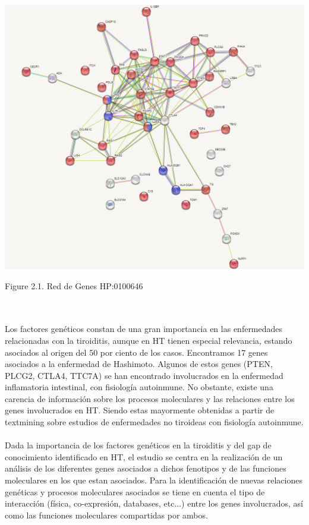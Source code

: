 \vspace{5mm}
\begin{center}
 
    \includegraphics[scale=0.4]{figures/red de genes.png}
    
    Figure 2.1. Red de Genes HP:0100646
\end{center}
\\ \\ 
\vspace{5mm}
Los factores genéticos constan de una gran importancia en las enfermedades relacionadas con la tiroiditis, aunque en HT tienen especial relevancia, estando asociados al origen del 50 por ciento de los casos.\cite{Zheng2020} Encontramos 17 genes asociados a la enfermedad de Hashimoto. Algunos de estos genes (PTEN, PLCG2, CTLA4, TTC7A) se han encontrado involucrados en la enfermedad inflamatoria intestinal, con fisiología autoinmune. No obstante, existe una carencia de información sobre los procesos moleculares y las relaciones entre los genes involucrados en HT. Siendo estas mayormente obtenidas a partir de textmining sobre estudios de enfermedades no tiroideas con fisiología autoinmune. \cite{StringHP:0000872}
\\ \\  
Dada la importancia de los factores genéticos en la tiroiditis y del gap de conocimiento identificado en HT, el estudio se centra en la realización de un análisis de los diferentes genes asociados a dichos fenotipos y de las funciones moleculares en los que estan asociados. Para la identificación de nuevas relaciones genéticas y procesos moleculares asociados se tiene en cuenta el tipo de interacción (física, co-expresión, databases, etc...) entre los genes involucrados, así como las funciones moleculares compartidas por ambos.









